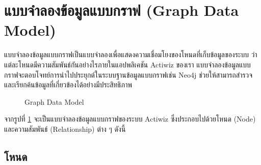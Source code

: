 \documentclass[14pt,oneside,openright,a4paper]{cpe-thai-project}
\begin{document}
\section{แบบจำลองข้อมูลแบบกราฟ (Graph Data Model)}
แบบจำลองข้อมูลแบบกราฟเป็นแบบจำลองเพื่อแสดงความเชื่อมโยงของโหนดที่เก็บข้อมูลของระบบ ว่าแต่ละโหนดมีความสัมพันธ์กันอย่างไรภายในแอปพลิเคชัน Actiwiz ของเรา แบบจำลองข้อมูลแบบกราฟจะตอบโจทย์การนำไปประยุกต์ในระบบฐานข้อมูลแบบกราฟเช่น Neo4j ช่วยให้สามารถสำรวจและเรียกค้นข้อมูลที่เกี่ยวข้องได้อย่างมีประสิทธิภาพ
  \begin{figure}[!h]\centering
    \setlength{\fboxrule}{0.5mm} %
    \setlength{\fboxsep}{0.5cm}
    \caption{Graph Data Model}\label{fig:Graph Data Model}
  \end{figure}
  \FloatBarrier
จากรูปที่ \ref{fig:Graph Data Model} จะเป็นแบบจำลองข้อมูลแบบกราฟของระบบ Actiwiz ซึ่งประกอบไปด้วยโหนด (Node) และความสัมพันธ์ (Relationship) ต่าง ๆ ดังนี้
  \subsection{โหนด}
\end{document}
